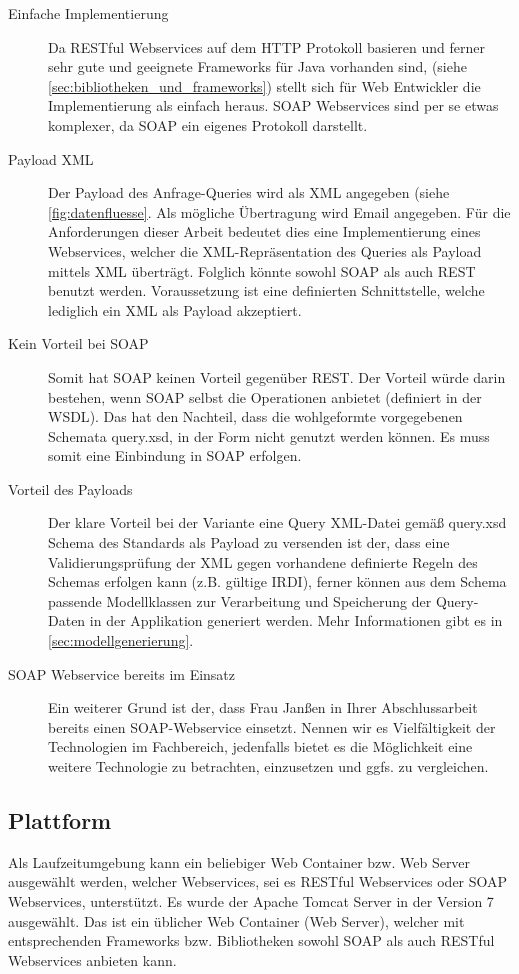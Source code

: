 \begin{description}
\item[Einfache Implementierung] Da \gls{REST}ful Webservices auf dem \gls{HTTP} Protokoll basieren und ferner sehr gute und geeignete Frameworks für Java vorhanden sind, (siehe \autoref{sec:bibliotheken_und_frameworks}) stellt sich für Web Entwickler die Implementierung als einfach heraus. \gls{SOAP} \glspl{Webservice} sind per se etwas komplexer, da \gls{SOAP} ein eigenes Protokoll darstellt. 
\item[Payload XML] Der Payload des Anfrage-Queries wird als XML angegeben (siehe \autoref{fig:datenfluesse}. Als mögliche Übertragung wird Email angegeben. Für die Anforderungen dieser Arbeit bedeutet dies eine Implementierung eines \glspl{Webservice}, welcher die XML-Repräsentation des Queries als Payload mittels XML überträgt. Folglich könnte sowohl \gls{SOAP} als auch \gls{REST} benutzt werden. Voraussetzung ist eine definierten Schnittstelle, welche lediglich ein XML als Payload akzeptiert. 
\item[Kein Vorteil bei SOAP] Somit hat \gls{SOAP} keinen Vorteil gegenüber \gls{REST}. Der Vorteil würde darin bestehen, wenn \gls{SOAP} selbst die Operationen anbietet (definiert in der \gls{WSDL}). Das hat den Nachteil, dass die wohlgeformte vorgegebenen Schemata query.xsd, in der Form nicht genutzt werden können. Es muss somit eine Einbindung in \gls{SOAP} erfolgen.
 \item[Vorteil des Payloads] Der klare Vorteil bei der Variante eine Query XML-Datei gemäß query.xsd Schema des Standards als Payload zu versenden ist der, dass eine Validierungsprüfung der XML gegen vorhandene definierte Regeln des Schemas erfolgen kann (z.B. gültige \gls{IRDI}), ferner können aus dem Schema passende Modellklassen zur Verarbeitung und Speicherung der Query-Daten in der Applikation generiert werden. Mehr Informationen gibt es in \autoref{sec:modellgenerierung}. 
\item[SOAP Webservice bereits im Einsatz] Ein weiterer Grund ist der, dass Frau Janßen in Ihrer Abschlussarbeit bereits einen SOAP-Webservice einsetzt. Nennen wir es Vielfältigkeit der Technologien im Fachbereich, jedenfalls bietet es die Möglichkeit eine weitere Technologie zu betrachten, einzusetzen und ggfs. zu vergleichen. 
\end{description}

\subsection{Plattform}  \label{sec:plattform}
Als Laufzeitumgebung kann ein beliebiger Web Container bzw. Web Server ausgewählt werden, welcher Webservices, sei es \gls{REST}ful \glspl{Webservice} oder \gls{SOAP} \glspl{Webservice}, unterstützt. 
Es wurde der \gls{Apache Tomcat} Server in der Version 7 ausgewählt. Das ist ein üblicher Web Container (Web Server), welcher mit entsprechenden Frameworks bzw. Bibliotheken sowohl \gls{SOAP} als auch \gls{REST}ful \glspl{Webservice} anbieten kann. 

